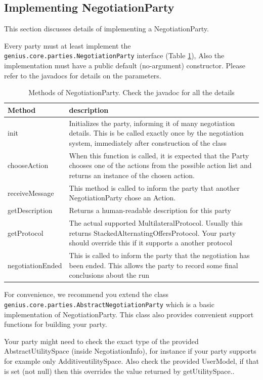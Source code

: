 \documentclass[]{llncs}
\begin{document}
\subsection{Implementing NegotiationParty}
This section discusses details of implementing a NegotiationParty.  

Every party must at least implement the \texttt{genius.core.parties.NegotiationParty} interface (Table \ref{table:NegotiationPartyInterface}),  Also the implementation must have a public default (no-argument) constructor. Please refer to the javadocs for details on the parameters.

\begin{table}[t]
  \centering
  \begin{tabular}{|p{4cm}|p{7cm}|}
  \hline
  Method & description \\
  \hline\hline
    init &Initializes the party, informing it of many negotiation details. This is be called exactly once by the negotiation system, immediately after construction of the class  \\
    chooseAction & When this function is called, it is expected that the Party chooses one  of the actions from the possible action list and returns an instance of the chosen action. \\
    receiveMessage & This method is called to inform the party that another NegotiationParty chose an Action.\\
    getDescription & Returns a human-readable description for this party \\
    getProtocol & The actual supported MultilateralProtocol. Usually this returns StackedAlternating\-Offers\-Protocol. Your party should override this if it supports a another protocol\\
    negotiationEnded & This is called to inform the party that the negotiation has been ended. This allows the party to record some final conclusions about the run\\
    \hline
  \end{tabular}
  \caption{Methods of NegotiationParty. Check the javadoc for all the details}
  \label{table:NegotiationPartyInterface}
\end{table}


For convenience, we recommend you extend the class \texttt{genius.core.parties.AbstractNegotiationParty} which is a basic implementation of NegotiationParty. This class also provides convenient support functions for building your party.

Your party might need to check the exact type of the provided AbstractUtilitySpace (inside NegotiationInfo), for instance if your party supports for example only AdditiveutilitySpace. Also check the provided UserModel, if that is set (not null) then this overrides the value returned by getUtilitySpace..
\end{document}
